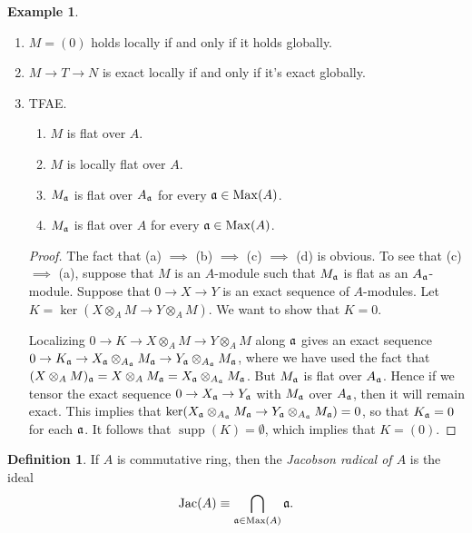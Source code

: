 \documentclass[10pt,letterpaper,cm]{nupset}
\theoremstyle{definition}
\newtheorem*{definition}{Definition}
\newtheorem{exmp}{Example}
\newcommand{\1}{\mathbf{1}}
\newcommand{\0}{\vec 0}
\DeclareMathOperator{\Jac}{Jac}
\DeclareMathOperator{\Max}{Max}
\DeclareMathOperator{\supp}{supp}
\begin{document}
\begin{exmp} $ $
\begin{enumerate}
\item $M = (0)$ holds locally if and only if it holds globally. 
\item $M \to T \to N$ is exact locally if and only if it's exact globally. 
\item TFAE.
\begin{enumerate}
\item $M$ is flat over $A$.  
\item $M$ is locally flat over $A$. 
\item $M_{\frak{a}}$ is flat over $A_{\frak{a}}$ for every $\frak{a} \in \Max(A)$. 
\item $M_{\frak{a}}$ is flat over $A$ for every $\frak{a} \in \Max(A)$. 
\end{enumerate}
\begin{proof}
The fact that (a) $\implies$ (b) $\implies$ (c) $\implies$ (d) is obvious. To see that (c) $\implies$ (a), suppose that $M$ is an $A$-module such that $M_{\frak{a}}$ is flat  as an $A_{\frak{a}}$-module. 
Suppose that $0 \to X \to Y$ is an exact sequence of $A$-modules. Let $K = \ker( X \otimes_A M \to Y \otimes_A M)$. We want to show that $K=0$.   

Localizing $0 \to K \to X \otimes_A M \to Y \otimes_A M$ along $\frak{a}$ gives an exact sequence $0 \to K_{\frak{a}} \to X_{\frak{a}} \otimes_{A_{\frak{a}}} M_{\frak{a}} \to Y_{\frak{a}} \otimes_{A_{\frak{a}}} M_{\frak{a}}$, where we have used the fact that $(X \otimes_A M)_{\frak{a}} = X \otimes_A M_{\frak{a}} = X_{\frak{a}} \otimes_{A_{\frak{a}}} M_{\frak{a}}$. But $M_{\frak{a}}$ is flat over $A_{\frak{a}}$. Hence if we tensor the exact sequence $0 \to X_{\frak{a}} \to Y_{\frak{a}}$ with $M_{\frak{a}}$ over $A_{\frak{a}}$, then it will remain exact. This implies that $\ker(X_{\frak{a}} \otimes_{A_{\frak{a}}} M_{\frak{a}} \to Y_{\frak{a}} \otimes_{A_{\frak{a}}} M_{\frak{a}}) =0$, so that $K_{\frak{a}} = 0$ for each $\frak{a}$. It follows that $\supp(K) = \emptyset$, which implies that $K= (0)$. 
\end{proof}
\end{enumerate}
\end{exmp}

\begin{definition}
If $A$ is commutative ring, then the \textit{Jacobson radical of $A$} is the ideal $$\Jac(A) \equiv \bigcap_{\frak{a} \in \Max(A)} \frak{a} .$$
\end{definition}
\end{document}

